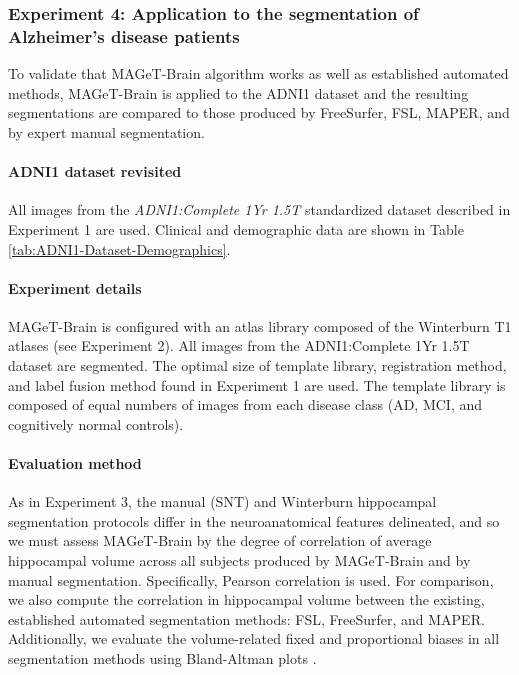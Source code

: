 \documentclass{article}\usepackage{graphicx, color}
\newcommand{\mb}{MAGeT-Brain }
\newcommand{\adnidataset}{ADNI1:Complete 1Yr 1.5T }
\begin{document}
\subsubsection{Experiment 4: Application to the segmentation of Alzheimer's
disease patients}

To validate that \mb algorithm works as well as established automated methods,
\mb is applied to the ADNI1 dataset and the resulting segmentations are
compared to those produced by FreeSurfer, FSL, MAPER, and by expert manual
segmentation.

\paragraph{ADNI1 dataset revisited} 
All images from the {\em \adnidataset} standardized dataset described
in Experiment 1 are used.  Clinical and demographic data are shown in Table
\ref{tab:ADNI1-Dataset-Demographics}. 

\paragraph{Experiment details} 
\mb is configured with an atlas library composed of the Winterburn T1 atlases
(see Experiment 2). All images from the \adnidataset dataset are
segmented. The optimal size of template library, registration method, and label
fusion method found in Experiment 1 are used. The template library is composed
of equal numbers of images from each disease class (AD, MCI, and cognitively
normal controls). 

\paragraph{Evaluation method}
As in Experiment 3, the manual (SNT) and Winterburn hippocampal segmentation
protocols differ in the neuroanatomical features delineated, and so we must
assess \mb by the degree of correlation of average hippocampal volume across all
subjects produced by \mb and by manual segmentation.  Specifically, Pearson
correlation is used.  For comparison, we also compute the correlation in
hippocampal volume between the existing, established automated segmentation
methods: FSL, FreeSurfer, and MAPER.  Additionally, we evaluate the
volume-related fixed and proportional biases in all segmentation methods using
Bland-Altman plots \citep{Bland1986}.  


\end{document}
